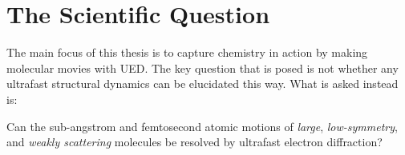 
\section{The Scientific Question}

The main focus of this thesis is to capture chemistry in action
by making molecular movies with UED.
%
The key question that is posed is not whether any ultrafast structural dynamics
can be elucidated this way. What is asked instead is:
%
\vspace{0.5\baselineskip}
%
\begin{center}
  \begin{minipage}{0.8\textwidth}
    Can the sub-angstrom and femtosecond atomic motions of \emph{large},
    \mbox{\emph{low-symmetry}}, and \emph{weakly scattering} molecules be resolved by
    \mbox{ultrafast} \mbox{electron} diffraction?
  \end{minipage}
\end{center}

\vspace{0.5\baselineskip}

